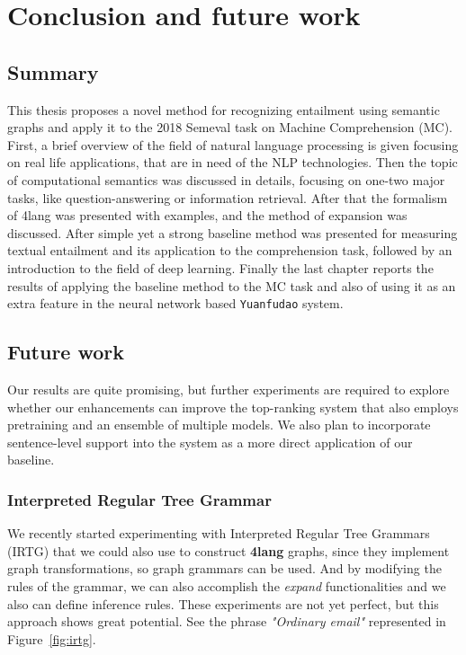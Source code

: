 \chapter{Conclusion and future work}
\label{chap:future}

\section{Summary}
This thesis proposes a novel method for recognizing entailment using semantic
graphs and apply it to the 2018 Semeval task on Machine
Comprehension (MC). First, a brief overview of the field of natural language processing is given focusing on real life applications, that are in need of the NLP technologies. Then the topic of computational semantics was discussed in details, focusing on one-two major tasks, like question-answering or information retrieval. After that the formalism of 4lang was presented with examples, and the method of expansion was discussed. After simple yet a strong baseline method was presented for measuring
textual entailment and its application to the comprehension task, followed by an introduction to the field of deep learning. Finally the last chapter reports the results of applying the baseline method
to the MC task and also of using it as an extra feature in the neural network
based \texttt{Yuanfudao} system.

\section{Future work}
Our results are quite promising, but
further experiments are required to explore whether our enhancements can
improve the top-ranking system that also employs
pretraining and an ensemble of multiple models.
We also plan to incorporate sentence-level support
into the system as a more direct application of our
baseline. 

\subsection{Interpreted Regular Tree Grammar}
We recently started experimenting with Interpreted Regular Tree Grammars \cite{Koller:2011} (IRTG) that we could also use to construct \textbf{4lang} graphs, since they implement graph transformations, so graph grammars can be used. And by modifying the rules of the grammar, we can also accomplish the \textit{expand} functionalities and we also can define inference rules. These experiments are not yet perfect, but this approach shows great potential. See the phrase \textit{"Ordinary email"} represented in Figure~\ref{fig:irtg}.

